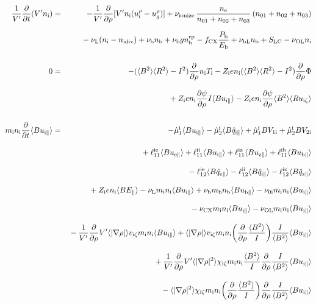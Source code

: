 \documentclass[11pt]{article}
\def\r#1{{\rm#1}}
\def\aves#1{\langle#1\rangle}
\def\dd#1#2{\frac{\partial #1}{\partial #2}}
\def\para{\parallel}
\def\ddrho{\frac{\partial}{\partial\rho}}
\def\ddt{\frac{\partial}{\partial t}}
\def\mi{m_\r{i}}
\def\mb{m_\r{b}}
\def\nee{n_\r{e}}
\def\ni{n_\r{i}}
\def\nb{n_\r{b}}
\def\Ti{T_\r{i}}
\def\Zi{Z_\r{i}}
\def\uzt#1{u_{\r{#1}\zeta}}
\def\upara#1{u_{\r{#1}\para}}
\def\qhatpara#1{\hat{q}_{\r{#1}\para}}
\def\urho#1{u_\r{#1}^\rho}
\def\ugrho{u_{g}^\rho}
\def\chis#1{\chi_\r{#1}}
\def\nun#1{\nu_\r{0#1}}
\def\ndiv#1{n_\r{#1div}}
\def\nbrp{n_\r{b}^\r{rp}}
\def\bri{\aves{B^2}\aves{R^2} - I^2}
\def\Pb{P_\r{b}}
\def\Eb{E_\r{b}}
\def\nna{n_{01}}
\def\nnb{n_{02}}
\def\nnc{n_{03}}
\def\fCX{f_\r{CX}}
\def\nuL{\nu_\r{L}}
\def\nuCX{\nu_\r{CX}}
\def\nuion{\nu_\r{ionize}}
\def\nub{\nu_\r{b}}
\def\nuOL{\nu_\r{OL}}
\def\nubL{\nu_\r{bL}}
\begin{document}
%
\begin{eqnarray}
  \frac{1}{V'} \ddt ( V' \ni ) &=&
%
  - \frac{1}{V'} \ddrho [ V' \ni (\urho{i} - \ugrho) ]
%
  + \nuion\, \frac{\nee}{\nna + \nnb + \nnc}\, (\nna + \nnb
  + \nnc)
\nonumber\\[2.5mm]&&{}
%
  - \nuL (\ni - \ndiv{i}) 
%
  + \nub \nb
%
  + \nub g \nbrp
%
  - \fCX \frac{\Pb}{\Eb}
%
  + \nubL \nb
%
  + S_\r{LC}
%
  - \nuOL \ni
%
\\[5mm]
  0 &=&
%
  -           ( \bri ) \ddrho \ni \Ti
%
  - \Zi e \ni ( \bri ) \ddrho \Phi
\nonumber\\[3mm]&&{}
%
  + \Zi e \ni \dd{\psi}{\rho} I          \aves{B\upara{i}}
%
  - \Zi e \ni \dd{\psi}{\rho} \aves{B^2} \aves{R\uzt{i}}
\\[5mm]
  \mi \ni \ddt \aves{B \upara{i}} &=&
%
  - \hat{\mu}_1^\r{i} \aves{B \upara{i}} 
  - \hat{\mu}_2^\r{i} \aves{B \qhatpara{i}}
%
  + \hat{\mu}_1^\r{i} {B V_{1\r{i}}} 
  + \hat{\mu}_2^\r{i} {B V_{2\r{i}}}
\nonumber\\[3mm]&&{}
%
  + \ell_{11}^{\r{ie}} \aves{B \upara{e}}
  + \ell_{11}^{\r{ii}} \aves{B \upara{i}}
  + \ell_{11}^{\r{iz}} \aves{B \upara{z}}
  + \ell_{11}^{\r{ib}} \aves{B \upara{b}}
\nonumber\\[3mm]&&{}
%
  - \ell_{12}^{\r{ie}} \aves{B \qhatpara{e}}
  - \ell_{12}^{\r{ii}} \aves{B \qhatpara{i}}
  - \ell_{12}^{\r{iz}} \aves{B \qhatpara{z}}
\nonumber\\[3mm]&&{}
%
  + \Zi e \ni \aves{B E_\para}
%
%
%
  - \nuL  \mi \ni \aves{B \upara{i}}
%
  + \nub  \mb \nb \aves{B \upara{b}}
%
  - \nun{i} \mi \ni \aves{B \upara{i}}
\nonumber\\[3mm]&&{}
%
  - \nuCX \mi \ni \aves{B \upara{i}}
%
  - \nuOL \mi \ni \aves{B \upara{i}}
\nonumber\\[3mm]&&{}
%
  - \frac{1}{V'} \ddrho V' \aves{|\nabla \rho|} v_{\r{i}\zeta} \mi \ni \aves{B \upara{i}}
%
  + \aves{|\nabla \rho|} v_{\r{i}\zeta} \mi \ni 
  \biggl(\ddrho \frac{\aves{B^2}}{I} \biggl) \frac{I}{\aves{B^2}} \aves{B \upara{i}}
\nonumber\\[3mm]&&{}
%
  + \frac{1}{V'} \ddrho V' \aves{|\nabla \rho|^2} \chis{i\zeta} \mi \ni
  \frac{\aves{B^2}}{I} \ddrho \frac{I}{\aves{B^2}} \aves{B \upara{i}}
\nonumber\\[3mm]&&{}
%
  - \aves{|\nabla \rho|^2} \chis{i\zeta} \mi \ni \biggl( \ddrho
  \frac{\aves{B^2}}{I} \biggr) \ddrho \frac{I}{\aves{B^2}} \aves{B \upara{i}}

\end{eqnarray}
\end{document}
